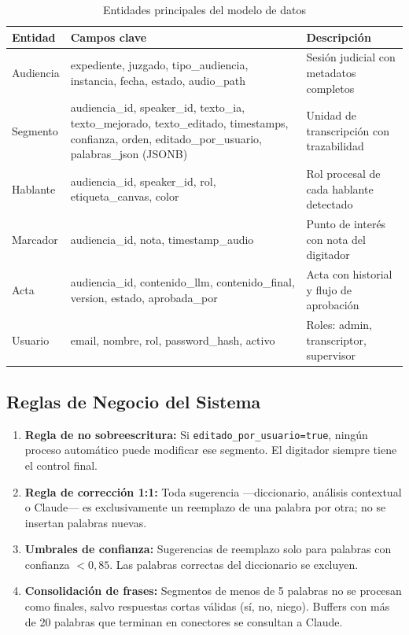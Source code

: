 \documentclass[12pt,a4paper,oneside]{report}
\begin{document}
\begin{table}[H]
\centering
\small
\caption{Entidades principales del modelo de datos}
\begin{tabular}{|p{2.2cm}|p{4cm}|p{6.5cm}|}
\hline
\rowcolor{gray!20}
\textbf{Entidad} & \textbf{Campos clave} & \textbf{Descripción} \\
\hline
Audiencia & expediente, juzgado, tipo\_audiencia, instancia, fecha, estado, audio\_path & Sesión judicial con metadatos completos \\
\hline
Segmento & audiencia\_id, speaker\_id, texto\_ia, texto\_mejorado, texto\_editado, timestamps, confianza, orden, editado\_por\_usuario, palabras\_json (JSONB) & Unidad de transcripción con trazabilidad \\
\hline
Hablante & audiencia\_id, speaker\_id, rol, etiqueta\_canvas, color & Rol procesal de cada hablante detectado \\
\hline
Marcador & audiencia\_id, nota, timestamp\_audio & Punto de interés con nota del digitador \\
\hline
Acta & audiencia\_id, contenido\_llm, contenido\_final, version, estado, aprobada\_por & Acta con historial y flujo de aprobación \\
\hline
Usuario & email, nombre, rol, password\_hash, activo & Roles: admin, transcriptor, supervisor \\
\hline
\end{tabular}
\label{tab:modelo_datos}
\end{table}

\subsection{Reglas de Negocio del Sistema}

\begin{enumerate}
\item \textbf{Regla de no sobreescritura:} Si \texttt{editado\_por\_usuario=true}, ningún proceso automático puede modificar ese segmento. El digitador siempre tiene el control final.
\item \textbf{Regla de corrección 1:1:} Toda sugerencia ---diccionario, análisis contextual o Claude--- es exclusivamente un reemplazo de una palabra por otra; no se insertan palabras nuevas.
\item \textbf{Umbrales de confianza:} Sugerencias de reemplazo solo para palabras con confianza $< 0{,}85$. Las palabras correctas del diccionario se excluyen.
\item \textbf{Consolidación de frases:} Segmentos de menos de 5 palabras no se procesan como finales, salvo respuestas cortas válidas (sí, no, niego). Buffers con más de 20 palabras que terminan en conectores se consultan a Claude.
\end{enumerate}
\end{document}
